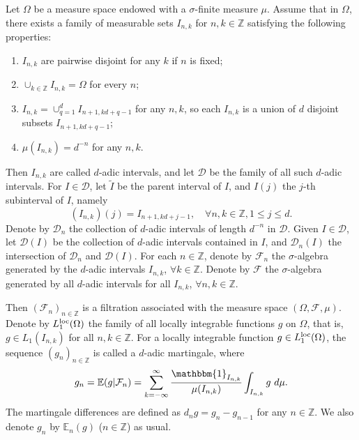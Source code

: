 \documentclass[oneside,english,a4wide]{amsart}
\numberwithin{equation}{section}
\numberwithin{figure}{section}
\theoremstyle{plain}
\theoremstyle{plain}
\theoremstyle{definition}
\theoremstyle{plain}
\theoremstyle{remark}
\theoremstyle{definition}
\theoremstyle{remark}
\theoremstyle{definition}
\newcommand{\8}{\infty}
\begin{document}
Let $\Omega$ be a measure space endowed with a $\sigma$-finite measure $\mu$. Assume that in $\Omega$, there exists a family of measurable sets $I_{n,k}$ for $n, k\in \mathbb{Z}$ satisfying the following properties:
\begin{enumerate}
	\item  $I_{n,k}$  are pairwise disjoint for any $k$ if $n$ is fixed;
	\item $\cup_{k\in \mathbb{Z}}I_{n,k}=\Omega$ for every $n$;
	\item $I_{n,k}=\cup_{q=1}^d I_{n+1,kd+q-1}$ for any $n, k$, so each $I_{n,k}$ is a union of $d$ disjoint subsets $I_{n+1,kd+q-1}$;
	\item $\mu(I_{n,k})=d^{-n}$ for any $n, k$.
\end{enumerate}
Then $I_{n,k}$ are called $d$-adic intervals, and let $\mathcal{ D}$ be the family of all such $d$-adic intervals. For $I\in \mathcal{D}$, let $\tilde{I}$ be the parent interval of $I$, and $I{(j)}$ the $j$-th subinterval of $I$, namely
\[(I_{n,k}){(j)}=I_{n+1,kd+j-1},\quad \forall n,k\in \mathbb{Z},1\le j\le d.\] 
Denote by $\mathcal{D}_n$ the collection of $d$-adic intervals of length $d^{-n}$ in $\mathcal{D}$. Given $I\in \mathcal{D}$, let $\mathcal{D}(I)$ be the collection of $d$-adic intervals contained in $I$, and $\mathcal{D}_n(I)$ the intersection of $\mathcal{D}_n$ and $\mathcal{D}(I)$.
For each $n\in \mathbb{Z}$, denote by $\mathcal{F}_n$ the $\sigma$-algebra generated by the $d$-adic intervals $I_{n,k}$, $\forall k\in \mathbb{Z}$. Denote by $\mathcal{F}$ the $\sigma$-algebra generated by all $d$-adic intervals for all $I_{n,k}$, $\forall n,k\in\mathbb{Z}$. 

Then $(\mathcal{F}_n)_{n\in \mathbb{Z}}$ is a filtration associated with the measure space $(\Omega, \mathcal{F}, \mu)$. Denote by $L^{\rm{loc}}_1(\Omega)$ the family of all locally integrable functions $g$ on $\Omega$, that is, $g\in L_1(I_{n, k})$ for all $n, k\in \mathbb{Z}$. For a locally integrable function $g\in L^{\rm{loc}}_1(\Omega)$, the sequence $(g_n)_{n\in\mathbb{Z}}$ is called a $d$-adic martingale, where
$$g_n= \mathbb{E}(g|\mathcal{F}_n)=\sum_{k=-\8}^{\8}\frac{\mathbbm{1}_{I_{n,k}}}{\mu(I_{n,k})}\int_{I_{n,k}}g\ d\mu.  $$
The martingale differences are defined as $d_n g=g_n-g_{n-1}$ for any $n\in\mathbb{Z}$. We also denote $g_n$ by $\mathbb{E}_n(g)$ ($n\in\mathbb{Z}$) as usual.
\end{document}
